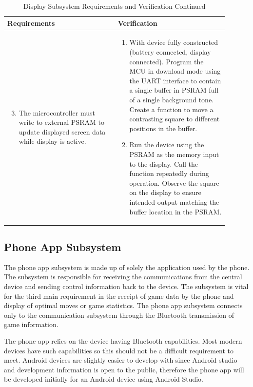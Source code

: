 \documentclass[12pt]{article}
\begin{document}
\begin{table}[!h]
	\caption{Display Subsystem Requirements and Verification Continued}
	\label{tab:display_rv_cont}
	\centering
	\begin{tabular}{| p{0.45\linewidth} | p{0.45\linewidth} |} 
 		\hline
 		\textbf{Requirements} & \textbf{Verification} \\ 
 		\hline
		\begin{enumerate}
		\setcounter{enumi}{2}
 			\item The microcontroller must write to external PSRAM to update displayed screen data while display is active.
		\end{enumerate} & \begin{enumerate}[label=\alph*)]
 			\item With device fully constructed (battery connected, display connected). Program the MCU in download mode using the UART interface to contain a single buffer in PSRAM full of a single background tone. Create a function to move a contrasting square to different positions in the buffer.
 			\item Run the device using the PSRAM as the memory input to the display. Call the function repeatedly during operation. Observe the square on the display to ensure intended output matching the buffer location in the PSRAM.
		\end{enumerate} \\
 		\hline
	\end{tabular}
\end{table}

\subsection{Phone App Subsystem}

The phone app subsystem is made up of solely the application used by the phone. The subsystem is responsible for receiving the communications from the central device and sending control information back to the device. The subsystem is vital for the third main requirement in the receipt of game data by the phone and display of optimal moves or game statistics. The phone app subsystem connects only to the communication subsystem through the Bluetooth transmission of game information.

The phone app relies on the device having Bluetooth capabilities. Most modern devices have such capabilities so this should not be a difficult requirement to meet. Android devices are slightly easier to develop with since Android studio and development information is open to the public, therefore the phone app will be developed initially for an Android device using Android Studio.
\end{document}

